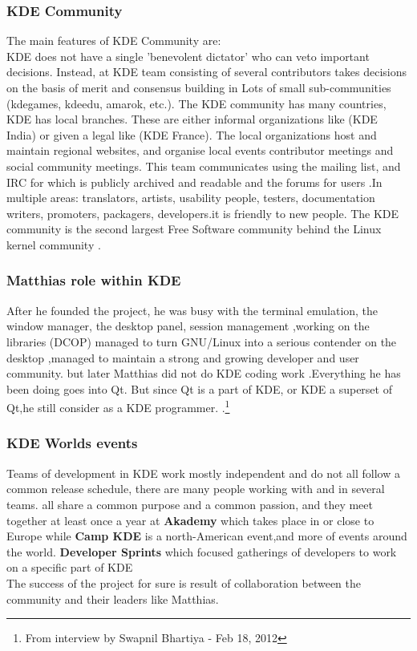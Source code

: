 \documentclass[DIV=calc, paper=a4, fontsize=11pt]{scrartcl}
\begin{document}
\subsubsection {KDE Community}
The main features of KDE Community are:\\
KDE does not have a single 'benevolent dictator' who can veto important decisions. Instead, at KDE  team consisting of several  contributors takes decisions on the basis of merit and consensus building in Lots of small sub-communities (kdegames, kdeedu, amarok, etc.).
The  KDE community has many countries, KDE has local branches. These are either informal organizations like (KDE India) or given a legal like  (KDE France). The local organizations host and maintain regional websites, and organise local events  contributor meetings and social community meetings.
This team communicates using the  mailing list, and IRC for which is publicly archived and readable  and  the forums for users .In multiple areas: translators, artists, usability people, testers, documentation writers, promoters, packagers, developers.it is friendly to new people.
The KDE community is the second largest Free Software community behind the Linux kernel community .
\subsubsection {Matthias role within KDE}
After he founded the project, he was busy with  the terminal emulation, the window manager, the desktop panel, session management ,working on the libraries (DCOP) managed to turn GNU/Linux into a serious contender on the desktop ,managed to maintain a strong and growing developer and user community.
but later Matthias did not do  KDE coding work .Everything he has been doing goes into Qt. But since Qt is a part of KDE, or KDE a superset of Qt,he still consider as a KDE programmer.
.\footnote {From interview by  Swapnil Bhartiya - Feb 18, 2012}
\subsubsection{KDE Worlds events}

Teams of development in KDE work mostly independent and do not all follow a common release schedule, there are many people working with and in several teams.  all share a common purpose and a common passion,  and they meet  together at least once a year at \textbf{Akademy}  which takes place in or close to Europe while \textbf{Camp KDE} is a north-American event,and more of events around the world.
\textbf{Developer Sprints} which focused gatherings of developers to work on a specific part of KDE\\
The success of the project for sure is result of collaboration between the community and their leaders like Matthias.
\end{document}

